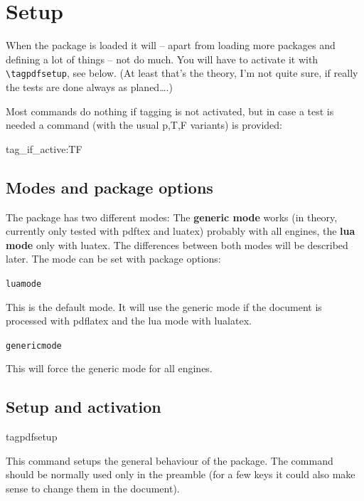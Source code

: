 \documentclass[DIV=12,parskip=half-,bibliography=totoc]{scrartcl}
\newcommand\DescribeKey[1]{\texttt{#1}}
\begin{document}
\tagpdfparaOn

\section{Setup}




When the package is loaded it will -- apart from loading more packages and defining a lot of things -- not do much. You will have to activate it with \verb+\tagpdfsetup+, see below. (At least that's the theory, I'm not quite sure, if really the tests are done always as planed\ldots.)

Most commands do nothing if tagging is not activated, but in case a test is needed a command (with the usual p,T,F variants) is provided:

\begin{docCommand}{tag_if_active:TF}{}\end{docCommand}

\subsection{Modes and package options}




The package has two different modes: The \textbf{generic mode} works (in theory, currently only tested with pdftex and luatex) probably with all engines, the \textbf{lua mode} only with luatex. The differences between both modes  will be described later. The mode can be set with package options:

\DescribeKey{luamode}

This is the default mode. It will use the generic mode if the document is processed with pdflatex and the lua mode with lualatex.

\DescribeKey{genericmode}

This will force the generic mode for all engines.


\subsection{Setup and activation}\label{ssec:setup}


\begin{docCommand}{tagpdfsetup}{}\end{docCommand}

This command setups the general behaviour of the package.
The command should be normally used only in the preamble
(for a few keys it could also make sense to change them in the document).
\end{document}
